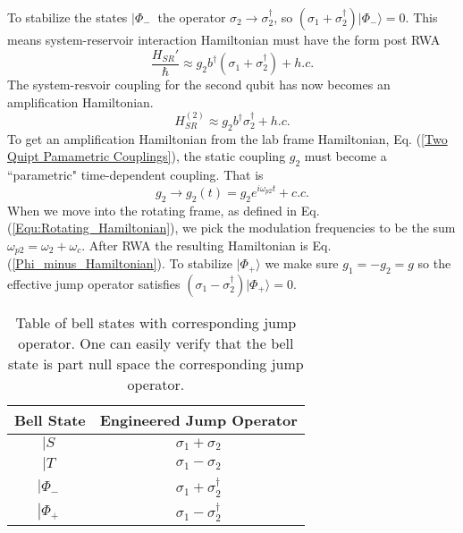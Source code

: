 To stabilize the states $\left| \Phi_- \>$ the operator $\sigma_2 \longrightarrow \sigma_2^\dagger$, so $(\sigma_1 + \sigma_2^\dagger)| \Phi_- \rangle = 0 $. This means system-reservoir interaction Hamiltonian must have the form post RWA
\begin{equation}\label{Phi_minus_Hamiltonian}
\frac{H_{SR}'}{\hbar} \approx g_2 b^\dagger( \sigma_1 + \sigma_2^\dagger) + h.c. 
\end{equation}
The system-resvoir coupling for the second qubit has now becomes an amplification Hamiltonian.
\begin{equation}
H_{SR}^{(2)} \approx g_2 b^\dagger \sigma_2^\dagger + h.c.
\end{equation}
To get an amplification Hamiltonian from the lab frame Hamiltonian, Eq. (\ref{Two Quipt Pamametric Couplings}), the static coupling $g_2$ must become a ``parametric" time-dependent coupling. That is
\begin{equation}
    g_2 \rightarrow g_2(t) = g_2 e^{i \omega_{p2} t} + c.c.
\end{equation}
When we move into the rotating frame, as defined in Eq. (\ref{Equ:Rotating_Hamiltonian}), we pick the modulation frequencies to be the sum $\omega_{p2} = \omega_2 + \omega_c$. After RWA the resulting Hamiltonian is Eq. (\ref{Phi_minus_Hamiltonian}). To stabilize $|\Phi_+\rangle$ we make sure $g_1=-g_2 =g$ so the effective jump operator satisfies $(\sigma_1 - \sigma_2^\dagger)| \Phi_+ \rangle = 0$.

\begin{table}\label{Bell State Table}
\centering
\begin{tabular}{c|c}
\centering
Bell State & Engineered Jump Operator \\
\hline
$\left| S \>$ & $\sigma_1 + \sigma_2$  \\
$\left| T \>$ & $\sigma_1 - \sigma_2$  \\
$\left| \Phi_- \>$  & $\sigma_1 + \sigma_2^\dagger$ \\
$\left| \Phi_+ \>$  & $\sigma_1 - \sigma_2^\dagger$ 
\end{tabular}
\caption{Table of bell states with corresponding jump operator. One can easily verify that the bell state is part null space the corresponding jump operator.}
\end{table}



